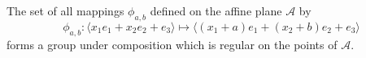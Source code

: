 The set of all mappings $\phi_{a,b}$ defined on the affine plane $\mathcal{A}$ by
$$\phi_{a,b}: \langle x_1 e_1 + x_2 e_2 + e_3 \rangle \mapsto \langle (x_1 + a) e_1 + (x_2 + b) e_2 + e_3 \rangle$$
forms a group under composition which is regular on the points of $\mathcal{A}$.
